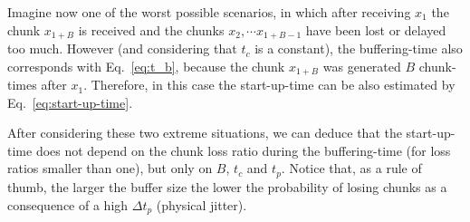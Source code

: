 Imagine now one of the worst possible scenarios, in which after
receiving $x_1$ the chunk $x_{1+B}$ is received and the
chunks $x_2, \cdots x_{1+B-1}$ have been lost or delayed too much.
However (and considering that $t_c$ is a constant), the buffering-time
also corresponds with Eq.~\ref{eq:t_b}, because the chunk $x_{1+B}$
was generated $B$ chunk-times after $x_1$. Therefore, in this case the
start-up-time can be also estimated by Eq.~\ref{eq:start-up-time}.

After considering these two extreme situations, we can deduce that the
start-up-time does not depend on the chunk loss ratio during the
buffering-time (for loss ratios smaller than one), but only
on $B$, $t_c$ and $t_p$. Notice that, as a rule of thumb,  
the larger the buffer size the lower the probability of losing
chunks as a consequence of a high $\Delta t_p$ (physical jitter).
